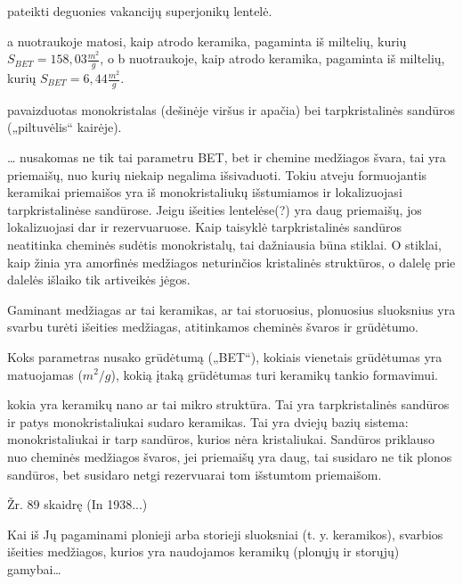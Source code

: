  pateikti deguonies vakancijų superjonikų lentelė.


 a nuotraukoje matosi, kaip atrodo keramika, pagaminta iš
miltelių, kurių $S_{BET}=158,03 \frac{m^{2}}{g}$, o b nuotraukoje,
kaip atrodo keramika, pagaminta iš miltelių, kurių
$S_{BET}=6,44 \frac{m^{2}}{g}$.

 pavaizduotas monokristalas (dešinėje viršus ir
apačia) bei tarpkristalinės sandūros („piltuvėlis“ kairėje).

… nusakomas ne tik tai parametru BET, bet ir chemine medžiagos švara,
tai yra priemaišų, nuo kurių niekaip negalima išsivaduoti. Tokiu
atveju formuojantis keramikai priemaišos yra iš monokristaliukų 
išstumiamos ir lokalizuojasi tarpkristalinėse sandūrose.
Jeigu išeities lentelėse(?)
yra daug priemaišų, jos lokalizuojasi dar ir rezervuaruose.
Kaip taisyklė tarpkristalinės sandūros neatitinka cheminės sudėtis
monokristalų, tai dažniausia būna stiklai. O stiklai, kaip
žinia yra amorfinės medžiagos neturinčios kristalinės struktūros,
o dalelę prie dalelės išlaiko tik artiveikės jėgos.

\begin{remember}
  \item Gaminant medžiagas ar tai keramikas, ar tai storuosius,
    plonuosius sluoksnius yra svarbu turėti išeities medžiagas,
    atitinkamos cheminės švaros ir grūdėtumo.
  \item Koks parametras nusako grūdėtumą („BET“),
    kokiais vienetais grūdėtumas yra matuojamas ($m^2/g$),
    kokią įtaką grūdėtumas turi keramikų tankio formavimui.
  \item kokia yra keramikų nano ar tai mikro struktūra. Tai yra
    tarpkristalinės sandūros ir patys monokristaliukai sudaro
    keramikas. Tai yra dviejų bazių sistema: monokristaliukai ir tarp
     sandūros, kurios nėra kristaliukai. Sandūros
    priklauso nuo cheminės medžiagos švaros, jei priemaišų yra
    daug, tai susidaro ne tik plonos sandūros, bet susidaro netgi
    rezervuarai tom išstumtom priemaišom.
\end{remember}

Žr. 89 skaidrę (In 1938...)

Kai iš Jų pagaminami plonieji arba storieji sluoksniai (t. y. keramikos),
svarbios išeities medžiagos, kurios yra naudojamos keramikų (plonųjų ir
storųjų) gamybai…

